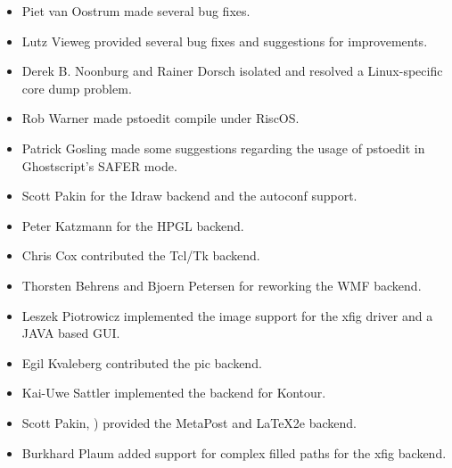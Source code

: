 \documentclass[english,a4paper]{article}
\begin{document}
\begin{itemize}
  \item Piet van Oostrum  made several bug fixes.
  
  \item Lutz Vieweg  provided several bug fixes and
     suggestions for improvements.
     
  \item Derek B. Noonburg  and Rainer Dorsch
      isolated and resolved a
     Linux-specific core dump problem.

  \item Rob Warner  made pstoedit compile under RiscOS.
  
  \item Patrick Gosling  made some suggestions
     regarding the usage of pstoedit in Ghostscript's SAFER mode.

  \item Scott Pakin  for the Idraw backend and the 
	autoconf support.

  \item Peter Katzmann  for the HPGL backend.
  
  \item Chris Cox  contributed the Tcl/Tk backend.
  
  \item Thorsten Behrens  and
     Bjoern Petersen for reworking the WMF backend.

  \item Leszek Piotrowicz  implemented the image
     support for the xfig driver and a JAVA based GUI.

  \item Egil Kvaleberg  contributed the pic backend.
  
  \item Kai-Uwe Sattler  implemented the
     backend for Kontour.

  \item Scott Pakin,  )   provided the MetaPost and LaTeX2e backend.
  
  \item Burkhard Plaum  added support for
     complex filled paths for the xfig backend.


\end{itemize}
\end{document}
